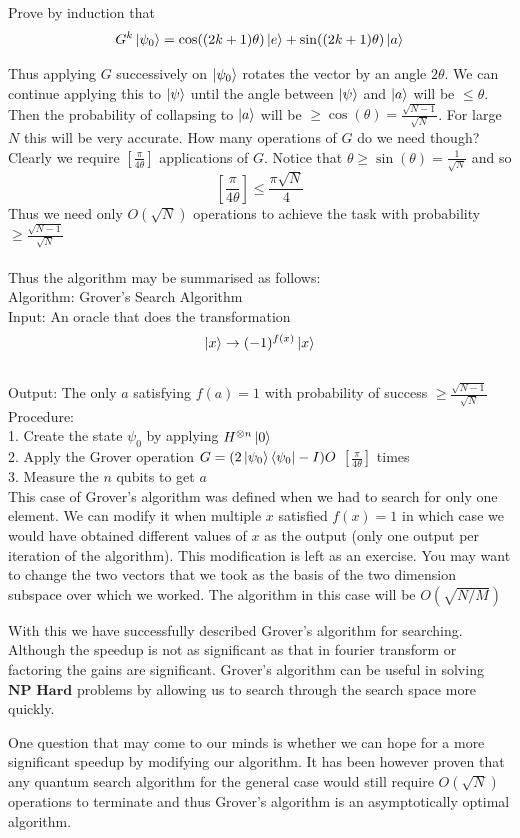 \begin{exercise}
Prove by induction that 
$$G^k \ket{\psi_0} = \cos((2k+1)\theta)\ket{e} + \sin((2k+1)\theta)\ket{a}$$
\end{exercise}

Thus applying $G$ successively on $\ket{\psi_0}$ rotates the vector by an angle $2\theta$. We can continue applying this to $\ket{\psi}$ until the angle between $\ket{\psi}$ and $\ket{a}$ will be $\leq \theta$. Then the probability of collapsing to $\ket{a}$ will be $\geq \cos(\theta) = \frac{\sqrt{N-1}}{\sqrt{N}}$. For large $N$ this will be very accurate.
How many operations of $G$ do we need though? Clearly we require $\left[ \frac{\pi}{4\theta} \right]$ applications of $G$.
Notice that $\theta \geq \sin(\theta) = \frac{1}{\sqrt{N}}$ and so 
$$\left[ \frac{\pi}{4\theta} \right] \leq \frac{\pi \sqrt{N}}{4}$$
Thus we need only $O(\sqrt{N})$ operations to achieve the task with probability $\geq \frac{\sqrt{N-1}}{\sqrt{N}}$\\\\

Thus the algorithm may be summarised as follows:\\

Algorithm: Grover's Search Algorithm\\
Input: An oracle that does the transformation $$ \ket{x} \to (-1)^{f(x)}\ket{x}$$\\
Output: The only $a$ satisfying $f(a) = 1$ with probability of success $\geq \frac{\sqrt{N-1}}{\sqrt{N}}$\\
Procedure:\\
1. Create the state $\psi_0$ by applying $H^{\otimes n}\ket{0}$\\
2. Apply the Grover operation $G = (2\ket{\psi_0}\bra{\psi_0} - I)O$ $\left[ \frac{\pi}{4\theta} \right]$ times\\
3. Measure the $n$ qubits to get $a$\\

This case of Grover's algorithm was defined when we had to search for only one element. We can modify it when multiple $x$ satisfied $f(x) = 1$ in which case we would have obtained different values of $x$ as the output (only one output per iteration of the algorithm). This modification is left as an exercise. You may want to change the two vectors that we took as the basis of the two dimension subspace over which we worked. The algorithm in this case will be $O(\sqrt{N/M})$

With this we have successfully described Grover's algorithm for searching. Although the speedup is not as significant as that in fourier transform or factoring the gains are significant. Grover's algorithm can be useful in solving $\textbf{NP Hard}$ problems by allowing us to search through the search space more quickly.

One question that may come to our minds is whether we can hope for a more significant speedup by modifying our algorithm. It has been however proven that any quantum search algorithm for the general case would still require $O(\sqrt{N})$ operations to terminate and thus Grover's algorithm is an asymptotically optimal algorithm.

